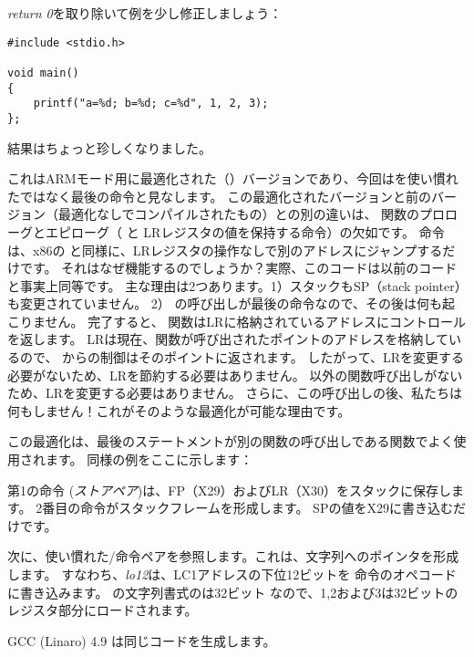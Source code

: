 \emph{return 0}を取り除いて例を少し修正しましょう：

\begin{lstlisting}[style=customc]
#include <stdio.h>

void main()
{
	printf("a=%d; b=%d; c=%d", 1, 2, 3);
};
\end{lstlisting}

結果はちょっと珍しくなりました。



これはARMモード用に最適化された（\Othree）バージョンであり、今回はを使い慣れたではなく最後の命令と見なします。
この最適化されたバージョンと前のバージョン（最適化なしでコンパイルされたもの）との別の違いは、
関数のプロローグとエピローグ（ と \ac{LR}レジスタの値を保持する命令）の欠如です。 
命令は、x86の \JMP と同様に、\ac{LR}レジスタの操作なしで別のアドレスにジャンプするだけです。
それはなぜ機能するのでしょうか？実際、このコードは以前のコードと事実上同等です。
主な理由は2つあります。1）スタックも\ac{SP}（\gls{stack pointer}）も変更されていません。 
2） \printf の呼び出しが最後の命令なので、その後は何も起こりません。
完了すると、 \printf 関数は\ac{LR}に格納されているアドレスにコントロールを返します。 
\ac{LR}は現在、関数が呼び出されたポイントのアドレスを格納しているので、 \printf からの制御はそのポイントに返されます。
したがって、\ac{LR}を変更する必要がないため、\ac{LR}を節約する必要はありません。 
\printf 以外の関数呼び出しがないため、\ac{LR}を変更する必要はありません。
さらに、この呼び出しの後、私たちは何もしません！これがそのような最適化が可能な理由です。

この最適化は、最後のステートメントが別の関数の呼び出しである関数でよく使用されます。
同様の例をここに示します：







第1の命令 (\emph{ストアペア})は、\ac{FP}（X29）および\ac{LR}（X30）をスタックに保存します。 
2番目の命令がスタックフレームを形成します。 
\ac{SP}の値をX29に書き込むだけです。

次に、使い慣れた/\ADD 命令ペアを参照します。これは、文字列へのポインタを形成します。 
すなわち、\emph{lo12}は、LC1アドレスの下位12ビットを \ADD 命令のオペコードに書き込みます。
\printf の文字列書式のは32ビット \Tint なので、1,2および3は32ビットのレジスタ部分にロードされます。

\Optimizing GCC (Linaro) 4.9 は同じコードを生成します。
